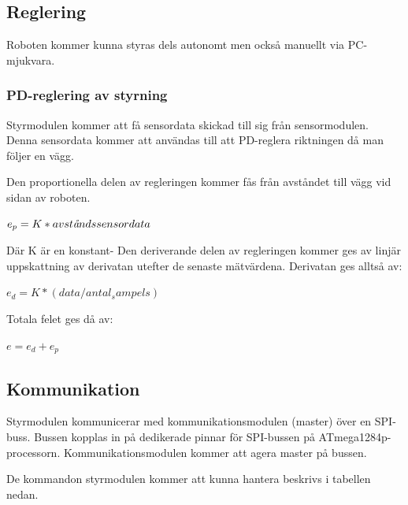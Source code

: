 \documentclass[a4paper,12pt,fleqn]{article}
\begin{document}
\subsection{Reglering}

Roboten kommer kunna styras dels autonomt men också manuellt via PC-mjukvara. 

\subsubsection{PD-reglering av styrning}
Styrmodulen kommer att få sensordata skickad till sig från sensormodulen. Denna sensordata kommer att användas till att PD-reglera riktningen då man följer en vägg. 

Den proportionella delen av regleringen kommer fås från avståndet till vägg vid sidan av roboten. 

$ e_p = K*avst\text{\it{å}}ndssensordata $

Där K är en konstant- Den deriverande delen av regleringen kommer ges av linjär uppskattning av derivatan utefter de senaste mätvärdena. Derivatan ges alltså av: 

$ e_d = K*(data/antal_sampels) $

Totala felet ges då av: 

$e = e_d + e_p$
\newpage



\subsection{Kommunikation}

Styrmodulen kommunicerar med kommunikationsmodulen (master) över en SPI-buss. Bussen kopplas in på dedikerade pinnar för SPI-bussen på ATmega1284p-processorn. Kommunikationsmodulen kommer att agera master på bussen. 

De kommandon styrmodulen kommer att kunna hantera beskrivs i tabellen nedan. 
~\\
\end{document}
